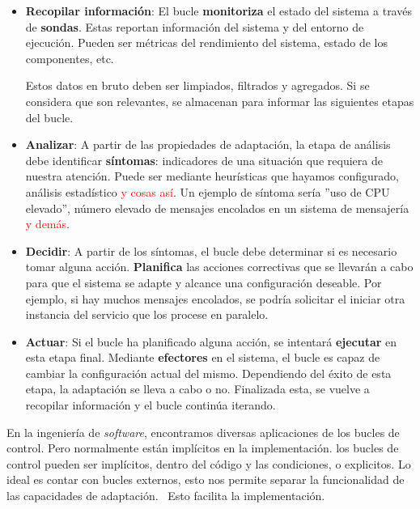 \begin{itemize}
  \item \textbf{Recopilar información}: El bucle \textbf{monitoriza} el estado del sistema a través de \textbf{sondas}. Estas reportan información del sistema y del entorno de ejecución. Pueden ser métricas del rendimiento del sistema, estado de los componentes, etc.

  Estos datos en bruto deben ser limpiados, filtrados y agregados. Si se considera que son relevantes, se almacenan para informar las siguientes etapas del bucle.

  \item \textbf{Analizar}: A partir de las propiedades de adaptación, la etapa de análisis debe identificar \textbf{síntomas}: indicadores de una situación que requiera de nuestra atención. Puede ser mediante heurísticas que hayamos configurado, análisis estadístico \textcolor{red}{y cosas así}. Un ejemplo de síntoma sería ''uso de CPU elevado'', número elevado de mensajes encolados en un sistema de mensajería \textcolor{red}{y demás}.

  \item \textbf{Decidir}: A partir de los síntomas, el bucle debe determinar si es necesario tomar alguna acción. \textbf{Planifica} las acciones correctivas que se llevarán a cabo para que el sistema se adapte y alcance una configuración deseable. Por ejemplo, si hay muchos mensajes encolados, se podría solicitar el iniciar otra instancia del servicio que los procese en paralelo.

  \item \textbf{Actuar}: Si el bucle ha planificado alguna acción, se intentará \textbf{ejecutar} en esta etapa final. Mediante \textbf{efectores} en el sistema, el bucle es capaz de cambiar la configuración actual del mismo. Dependiendo del éxito de esta etapa, la adaptación se lleva a cabo o no. Finalizada esta, se vuelve a recopilar información y el bucle continúa iterando.
\end{itemize}

En la ingeniería de \emph{software}, encontramos diversas aplicaciones de los bucles de control. Pero normalmente están implícitos en la implementación. \cite{brunEngineeringSelfAdaptiveSystems2009}
los bucles de control pueden ser implícitos, dentro del código y las condiciones, o explicitos. \cite{brunEngineeringSelfAdaptiveSystems2009} Lo ideal es contar con bucles externos, esto nos permite separar la funcionalidad de las capacidades de adaptación. \ Esto facilita la implementación.

